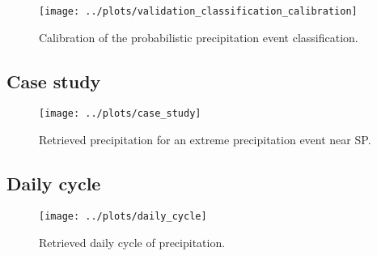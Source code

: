 \documentclass[journal abbreviation, manuscript]{copernicus}
\begin{document}
{\begin{figure}
  \centering
  \texttt{[image: ../plots/validation\_classification\_calibration]}
  \caption{
    Calibration of the probabilistic precipitation event classification. 
    }
  \label{fig:evaluation_scatter}
\end{figure}

\subsection{Case study}


\begin{figure}
  \centering
  \texttt{[image: ../plots/case\_study]}
  \caption{
    Retrieved precipitation for an extreme precipitation event near SP.
    }
  \label{fig:evaluation_scatter}
\end{figure}

\subsection{Daily cycle}


\begin{figure}
  \centering
  \texttt{[image: ../plots/daily\_cycle]}
  \caption{
    Retrieved daily cycle of precipitation.
    }
  \label{fig:evaluation_scatter}
\end{figure}











\appendix
\section{}    %

\subsection{}     %


}
\end{document}
